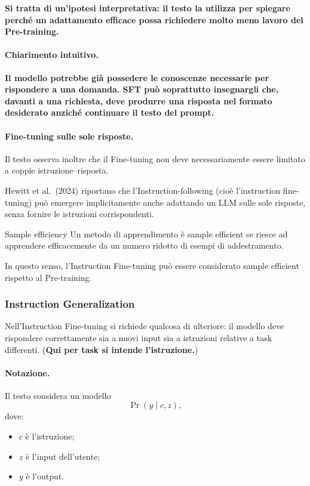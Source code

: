 \textbf{Si tratta di un'ipotesi interpretativa:
il testo la utilizza per spiegare perché
un adattamento efficace possa richiedere
molto meno lavoro del Pre-training.
}

\paragraph{Chiarimento intuitivo.}
\textbf{Il modello potrebbe già possedere le conoscenze
necessarie per rispondere a una domanda.
SFT può soprattutto insegnargli che, davanti
a una richiesta, deve produrre una risposta
nel formato desiderato anziché continuare
il testo del prompt.}


\paragraph{Fine-tuning sulle sole risposte.}
Il testo osserva inoltre che il Fine-tuning
non deve necessariamente essere limitato
a coppie istruzione--risposta.

Hewitt et al.\ (2024) riportano che
l'Instruction-following (cioè l'instruction fine-tuning) può emergere implicitamente
anche adattando un LLM sulle sole risposte,
senza fornire le istruzioni corrispondenti.

\begin{definition}{Sample efficiency}
Un metodo di apprendimento è sample efficient
se riesce ad apprendere efficacemente
da un numero ridotto di esempi di addestramento.
\end{definition}

In questo senso, l'Instruction Fine-tuning
può essere considerato sample efficient
rispetto al Pre-training.


\subsubsection{Instruction Generalization}
Nell'Instruction Fine-tuning si richiede qualcosa
di ulteriore: il modello deve rispondere correttamente
sia a nuovi input sia a istruzioni relative
a task differenti. (\textbf{Qui per task si intende l'istruzione.})

\paragraph{Notazione.}
Il testo considera un modello
\[
\Pr(y\mid c,z),
\]
dove:

\begin{itemize}
    \item $c$ è l'istruzione;

    \item $z$ è l'input dell'utente;

    \item $y$ è l'output.
\end{itemize}

